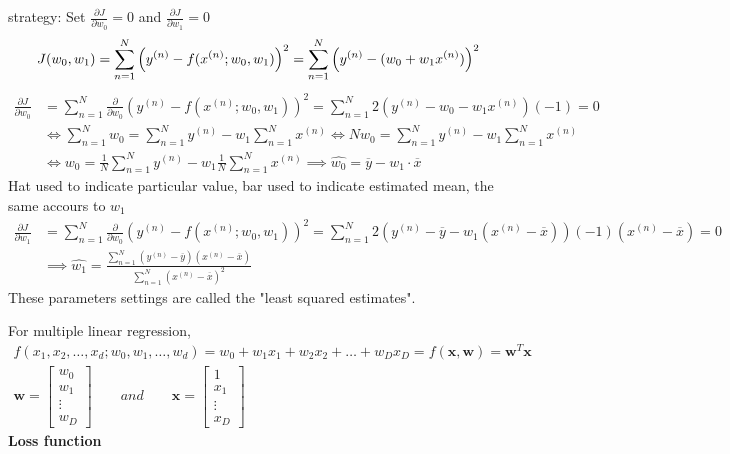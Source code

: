 \documentclass[a4paper, 11pt]{article}
\begin{document}
strategy: Set $\frac{\partial J}{\partial w_0} = 0$ and $\frac{\partial J}{\partial w_1} = 0$
\[
    J(w_0, w_1) = \sum\limits_{n = 1}^{N}\left(y^{(n)} - f(x^{(n)};w_0, w_1)\right)^2 = \sum\limits_{n = 1}^{N}\left(y^{(n)} - (w_0 + w_1x^{(n)})\right)^2\\
\]
\begin{align*}
    \frac{\partial J}{\partial w_0} &= \sum\limits_{n = 1}^{N}\frac{\partial}{\partial w_0}\left(y^{(n)} - f(x^{(n)};w_0, w_1)\right)^2 = \sum\limits_{n = 1}^{N}2\left(y^{(n)} - w_0 - w_1x^{(n)}\right)(-1) = 0\\
    &\iff \sum\limits_{n = 1}^{N}w_0 = \sum\limits_{n = 1}^{N}y^{(n)} - w_1\sum\limits_{n = 1}^{N}x^{(n)} \iff Nw_0 = \sum\limits_{n = 1}^{N}y^{(n)} - w_1\sum\limits_{n = 1}^{N}x^{(n)}\\
    &\iff w_0 = \frac{1}{N}\sum\limits_{n = 1}^{N}y^{(n)} - w_1\frac{1}{N}\sum\limits_{n = 1}^{N}x^{(n)} \implies \hat{w_0} = \overline{y} - w_1\cdot\overline{x}
\end{align*}
Hat used to indicate particular value, bar used to indicate estimated mean, the same accours to $w_1$
\begin{align*}
    \frac{\partial J}{\partial w_1} &= \sum\limits_{n = 1}^{N}\frac{\partial}{\partial w_0}\left(y^{(n)} - f(x^{(n)};w_0, w_1)\right)^2 = \sum\limits_{n = 1}^{N}2\left(y^{(n)}-\overline{y} - w_1(x^{(n)}-\overline{x})\right)(-1)(x^{(n)}-\overline{x}) = 0\\
    &\implies \hat{w_1} = \frac{\sum\limits_{n  =1}^{N}(y^{(n)}-\overline{y})(x^{(n)} - \overline{x})}{\sum\limits_{n = 1}^{N}\left(x^{(n)}-\overline{x}\right)^2}
\end{align*}
These parameters settings are called the "least squared estimates".

For multiple linear regression, 
\begin{gather*}
    f(x_1, x_2, \dots, x_d; w_0, w_1, \dots, w_d) = w_0 + w_1x_1 + w_2x_2 + \dots + w_Dx_D = f(\mathbf{x}, \mathbf{w}) = \mathbf{w}^{T}\mathbf{x}\\
    \mathbf{w} = \left[
        \begin{array}{c}
        w_0\\
        w_1\\
        \vdots\\
        w_D
        \end{array}
        \right]\qquad and\qquad \mathbf{x} = \left[
            \begin{array}{c}
                1\\
                x_1\\
                \vdots\\
                x_D
            \end{array}
        \right]
\end{gather*}
{\Large\textbf{Loss function}}
\end{document}
